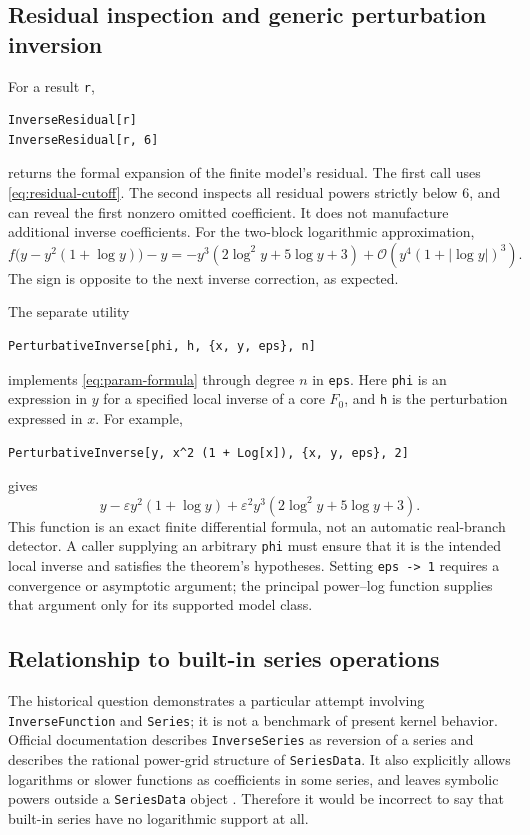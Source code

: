 \documentclass[11pt,a4paper]{article}
\numberwithin{equation}{section}
\theoremstyle{definition}
\newcommand{\OO}{\mathcal O}
\newcommand{\code}[1]{\texttt{#1}}
\begin{document}
\subsection{Residual inspection and generic perturbation inversion}
For a result \code{r},
\begin{lstlisting}
InverseResidual[r]
InverseResidual[r, 6]
\end{lstlisting}
returns the formal expansion of the finite model's residual. The first
call uses \eqref{eq:residual-cutoff}. The second inspects all residual
powers strictly below $6$, and can reveal the first nonzero omitted
coefficient. It does not manufacture additional inverse coefficients.
For the two-block logarithmic approximation,
\[
 f\bigl(y-y^2(1+\log y)\bigr)-y
 =-y^3(2\log^2y+5\log y+3)+\OO(y^4(1+|\log y|)^3).
\]
The sign is opposite to the next inverse correction, as expected.

The separate utility
\begin{lstlisting}
PerturbativeInverse[phi, h, {x, y, eps}, n]
\end{lstlisting}
implements \eqref{eq:param-formula} through degree $n$ in
\code{eps}. Here \code{phi} is an expression in $y$ for a specified local
inverse of a core $F_0$, and \code{h} is the perturbation expressed in $x$.
For example,
\begin{lstlisting}
PerturbativeInverse[y, x^2 (1 + Log[x]), {x, y, eps}, 2]
\end{lstlisting}
gives
\[
 y-\varepsilon y^2(1+\log y)
 +\varepsilon^2y^3(2\log^2y+5\log y+3).
\]
This function is an exact finite differential formula, not an automatic
real-branch detector. A caller supplying an arbitrary \code{phi} must
ensure that it is the intended local inverse and satisfies the theorem's
hypotheses. Setting \code{eps -> 1} requires a convergence or asymptotic
argument; the principal power--log function supplies that argument only
for its supported model class.

\subsection{Relationship to built-in series operations}
The historical question demonstrates a particular attempt involving
\code{InverseFunction} and \code{Series}; it is not a benchmark of present
kernel behavior. Official documentation describes \code{InverseSeries}
as reversion of a series and describes the rational power-grid structure
of \code{SeriesData}. It also explicitly allows logarithms or slower
functions as coefficients in some series, and leaves symbolic powers
outside a \code{SeriesData} object \cite{wl-seriesdata,wl-inverseseries}.
Therefore it would be incorrect to say that built-in series have no
logarithmic support at all.
\end{document}
